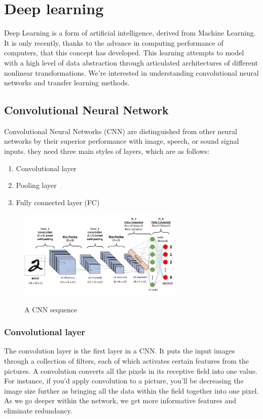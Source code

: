 \documentclass[12pt,a4paper,oneside,english]{book}
\begin{document}
\section{Deep learning}
Deep Learning is a form of artificial intelligence, derived from Machine Learning. It is only recently, thanks to the advance in computing performance of computers, that this concept has developed. This learning attempts to model with a high level of data abstraction through articulated architectures of different nonlinear transformations. We’re interested in understanding convolutional neural networks and transfer learning methods.

\subsection{Convolutional Neural Network}

Convolutional Neural Networks (CNN) are distinguished from other neural networks by their superior performance with image, speech, or sound signal inputs. they need three main styles of layers, which are as follows:
\begin{enumerate}
    \item Convolutional layer
    \item Pooling layer
    \item Fully connected layer (FC)
\end{enumerate}

\begin{figure}[H]
    \centering
    \includegraphics[width=0.7\textwidth]{figures/cnn_sequence.jpeg}
    \caption{A CNN sequence}
    \label{fig:cnn}
    \cite{cnnSequence}
\end{figure}

\subsubsection{Convolutional layer}
The convolution layer is the first layer in a CNN. It puts the input images through a collection of filters, each of which activates certain features from the pictures. A convolution converts all the pixels in its receptive field into one value. For instance, if you'd apply convolution to a picture, you'll be decreasing the image size further as bringing all the data within the field together into one pixel. As we go deeper within the network, we get more informative features and eliminate redundancy.
\end{document}
